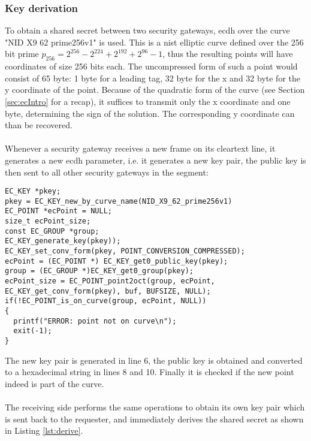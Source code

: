 \subsubsection{Key derivation}
To obtain a shared secret between two security gateways, \gls{ecdh} over the curve
"NID X9 62 prime256v1" is used. This is a \gls{nist} elliptic curve defined over the 256 bit prime
$p_{256} = 2^{256} - 2^{224} + 2^{192} + 2^{96} - 1$, thus the resulting points will have coordinates of size 256 bits each. The uncompressed form of such a point would consist of 65
byte: 1 byte for a leading tag, 32 byte for the x and 32 byte for the y coordinate of the point. Because of the quadratic form of the curve (see Section \ref{sec:ecIntro} for a recap),
it suffices to transmit only the x coordinate and one byte, determining the sign of the solution. The corresponding y coordinate can than be recovered.
\\
\\
Whenever a security gateway receives a new frame on its cleartext line, it generates a new \gls{ecdh} parameter, i.e. it generates a new key pair, the public key is then sent to all
other security gateways in the segment:
\begin{lstlisting}[style=cStyle,caption={Generating a \gls{ecdh} parameter},label=lst:genEC]
EC_KEY *pkey;
pkey = EC_KEY_new_by_curve_name(NID_X9_62_prime256v1)
EC_POINT *ecPoint = NULL;
size_t ecPoint_size;
const EC_GROUP *group;
EC_KEY_generate_key(pkey));
EC_KEY_set_conv_form(pkey, POINT_CONVERSION_COMPRESSED);
ecPoint = (EC_POINT *) EC_KEY_get0_public_key(pkey);
group = (EC_GROUP *)EC_KEY_get0_group(pkey);
ecPoint_size = EC_POINT_point2oct(group, ecPoint, EC_KEY_get_conv_form(pkey), buf, BUFSIZE, NULL);
if(!EC_POINT_is_on_curve(group, ecPoint, NULL))
{
  printf("ERROR: point not on curve\n");
  exit(-1);
}
\end{lstlisting}
The new key pair is generated in line 6, the public key is obtained and converted to a hexadecimal string in lines 8 and 10. Finally it is checked if the new point indeed is part of
the curve.
\\
\\
The receiving side performs the same operations to obtain its own key pair which is sent back to the requester, and immediately derives the shared secret
as shown in Listing \ref{lst:derive}.

